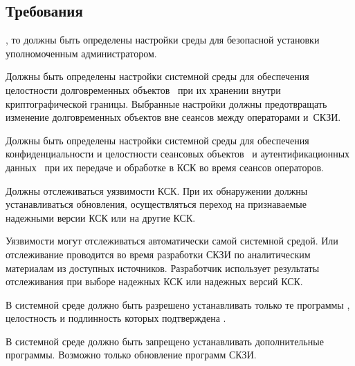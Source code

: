 \subsection{Требования}\label{ES.Reqs}

\label{R.ES.Install} %
,
то должны быть определены настройки среды для безопасной установки 
уполномоченным администратором.

\label{R.ES.Objects} %
Должны быть определены настройки системной среды
для обеспечения целостности долговременных объектов~ 
при их хранении внутри криптографической границы. 
%
Выбранные настройки должны предотвращать 
изменение долговременных объектов вне сеансов между операторами и~СКЗИ.

\label{R.ES.Session} %
Должны быть определены настройки системной среды
для обеспечения конфиденциальности и целостности сеансовых 
объектов~ и аутентификационных 
данных~ при их передаче и  
обработке в КСК во время сеансов операторов.

\label{R.ES.CVE} %
Должны отслеживаться уязвимости КСК. При их обнаружении должны 
устанавливаться обновления, осуществляться переход на признаваемые надежными
версии КСК или на другие КСК.

\begin{note*}
Уязвимости могут отслеживаться 
автоматически самой системной средой.
Или отслеживание проводится во время разработки СКЗИ по аналитическим
материалам из доступных источников. Разработчик использует результаты
отслеживания при выборе надежных КСК или надежных версий КСК.
\end{note*}

\label{R.ES.AuthCode} %
В системной среде должно быть разрешено устанавливать только те программы
, 
целостность и подлинность которых подтверждена .

\label{R.ES.NoCode} %
В системной среде должно быть запрещено устанавливать дополнительные программы.
Возможно только обновление программ СКЗИ.

